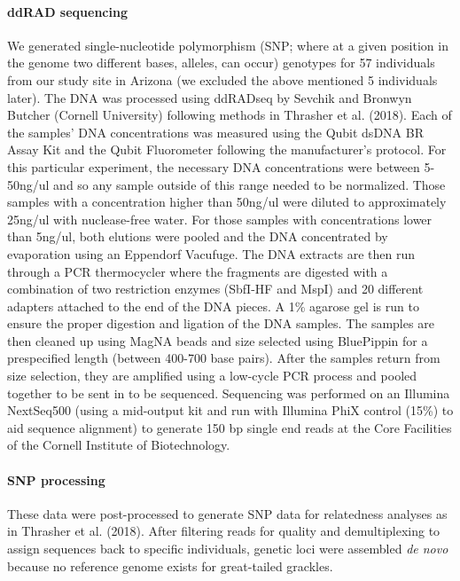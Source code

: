\documentclass[]{article}
\let\oldparagraph\paragraph
\renewcommand{\paragraph}[1]{\oldparagraph{#1}\mbox{}}
\begin{document}
\hypertarget{ddrad-sequencing}{%
\paragraph{ddRAD sequencing}\label{ddrad-sequencing}}

We generated single-nucleotide polymorphism (SNP; where at a given
position in the genome two different bases, alleles, can occur)
genotypes for 57 individuals from our study site in Arizona (we excluded
the above mentioned 5 individuals later). The DNA was processed using
ddRADseq by Sevchik and Bronwyn Butcher (Cornell University) following
methods in Thrasher et al. (2018). Each of the samples' DNA
concentrations was measured using the Qubit dsDNA BR Assay Kit and the
Qubit Fluorometer following the manufacturer's protocol. For this
particular experiment, the necessary DNA concentrations were between
5-50ng/ul and so any sample outside of this range needed to be
normalized. Those samples with a concentration higher than 50ng/ul were
diluted to approximately 25ng/ul with nuclease-free water. For those
samples with concentrations lower than 5ng/ul, both elutions were pooled
and the DNA concentrated by evaporation using an Eppendorf Vacufuge. The
DNA extracts are then run through a PCR thermocycler where the fragments
are digested with a combination of two restriction enzymes (SbfI-HF and
MspI) and 20 different adapters attached to the end of the DNA pieces. A
1\% agarose gel is run to ensure the proper digestion and ligation of
the DNA samples. The samples are then cleaned up using MagNA beads and
size selected using BluePippin for a prespecified length (between
400-700 base pairs). After the samples return from size selection, they
are amplified using a low-cycle PCR process and pooled together to be
sent in to be sequenced. Sequencing was performed on an Illumina
NextSeq500 (using a mid-output kit and run with Illumina PhiX control
(15\%) to aid sequence alignment) to generate 150 bp single end reads at
the Core Facilities of the Cornell Institute of Biotechnology.

\hypertarget{snp-processing}{%
\paragraph{SNP processing}\label{snp-processing}}

These data were post-processed to generate SNP data for relatedness
analyses as in Thrasher et al. (2018). After filtering reads for quality
and demultiplexing to assign sequences back to specific individuals,
genetic loci were assembled \emph{de novo} because no reference genome
exists for great-tailed grackles.
\end{document}
